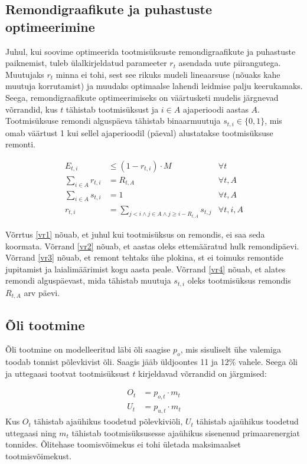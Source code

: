 \documentclass[10pt,a4paper]{article}
\begin{document}
\subsection{Remondigraafikute ja puhastuste optimeerimine}
Juhul, kui soovime optimeerida tootmisüksuste remondigraafikute ja puhastuste paiknemist, tuleb ülalkirjeldatud parameeter $r_t$ asendada uute piirangutega. Muutujaks $r_t$ minna ei tohi, sest see rikuks mudeli lineaarsuse (nõuaks kahe muutuja korrutamist) ja muudaks optimaalse lahendi leidmise palju keerukamaks. Seega, remondigraafikute optimeerimiseks on väärtusketi mudelis järgnevad võrrandid, kus $t$ tähistab tootmisüksust ja $i\in A$ ajaperioodi aastas $A$. Tootmisüksuse remondi alguspäeva tähistab binaarmuutuja $s_{t,i} \in \{0,1\}$, mis omab väärtust 1 kui sellel ajaperioodil (päeval) alustatakse tootmisüksuse remonti.

\begin{align}
E_{t,i} &\leq (1 - r_{t,i}) \cdot M & \forall t \label{vr1} \\  
\sum_{i \in A} r_{t,i} &= R_{t,A} & \forall t, A \label{vr2} \\ 
\sum_{i \in A} s_{t,i} &= 1 & \forall t, A \label{vr3} \\
r_{t,i} &= \sum_{j < i \land  j \in A \land j \geq i - R_{t,A} } s_{t,j} & \forall t, i, A \label{vr4}
\end{align}

Võrrtus \eqref{vr1} nõuab, et juhul kui tootmisüksus on remondis, ei saa seda koormata. Võrrand \eqref{vr2} nõuab, et aastas oleks ettemääratud hulk remondipäevi. Võrrand \eqref{vr3} nõuab, et remont tehtaks ühe plokina, st ei toimuks remontide jupitamist ja laialimäärimist kogu aasta peale. Võrrand \eqref{vr4} nõuab, et alates remondi alguspäevast, mida tähistab muutuja $s_{t,i}$ oleks tootmisüksus remondis $R_{t,A}$ arv päevi.

\subsection{Õli tootmine}
Õli tootmine on modelleeritud läbi õli saagise $p_o$, mis sisuliselt ühe valemiga toodab tonnist põlevkivist õli. Saagis jääb üldjoontes 11 ja 12\% vahele. Seega õli ja uttegaasi tootvat tootmisüksust $t$ kirjeldavad võrrandid on järgmised:

\begin{align}
O_{t} &= p_{o,t} \cdot m_t \\
U_{t} &= p_{u,t} \cdot m_t 
\end{align}
Kus $O_t$ tähistab ajaühikus toodetud põlevkiviõli, $U_t$ tähistab ajaühikus toodetud uttegaasi ning $m_t$ tähistab tootmisüksusesse ajaühikus sisenenud primaarenergiat tonnides. Õlitehase toomisvõimekus ei tohi ületada maksimaalset tootmisvõimekust.
\end{document}
